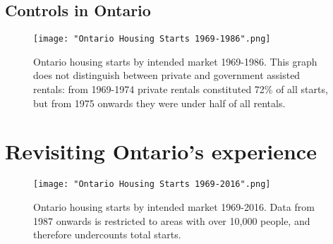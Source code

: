 \subsection{Controls in Ontario}

\begin{figure}[ht]
\centering 
\texttt{[image: "Ontario Housing Starts 1969-1986".png]}
\caption[Ontario housing starts by intended market 1969-1986]{Ontario housing starts by intended market 1969-1986. This graph does not distinguish between private and government assisted rentals: from 1969-1974 private rentals constituted 72\% of all starts, but from 1975 onwards they were under half of all rentals.}
\label{fig:gallery} 
\end{figure}

\section{Revisiting Ontario's experience}



\begin{figure}[ht]
\centering 
\texttt{[image: "Ontario Housing Starts 1969-2016".png]}
\caption[Ontario housing starts by intended market 1969-2016]{Ontario housing starts by intended market 1969-2016. Data from 1987 onwards is restricted to areas with over 10,000 people, and therefore undercounts total starts.}
\label{fig:gallery} 
\end{figure}


